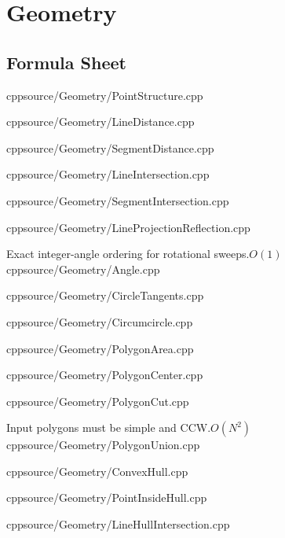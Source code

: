 \documentclass[portrait, 8pt, a4paper, oneside, twocolumn]{extarticle}
\begin{document}
\section {Geometry}

\subsection{Formula Sheet}


{}{}
{cpp}{source/Geometry/PointStructure.cpp}

{cpp}{source/Geometry/LineDistance.cpp}

{cpp}{source/Geometry/SegmentDistance.cpp}

{cpp}{source/Geometry/LineIntersection.cpp}

{cpp}{source/Geometry/SegmentIntersection.cpp}

{cpp}{source/Geometry/LineProjectionReflection.cpp}


{Exact integer-angle ordering for rotational sweeps.}{$O(1)$}
{cpp}{source/Geometry/Angle.cpp}

{cpp}{source/Geometry/CircleTangents.cpp}

{cpp}{source/Geometry/Circumcircle.cpp}

{cpp}{source/Geometry/PolygonArea.cpp}

{cpp}{source/Geometry/PolygonCenter.cpp}

{cpp}{source/Geometry/PolygonCut.cpp}

{Input polygons must be simple and CCW.}{$O(N^2)$}
{cpp}{source/Geometry/PolygonUnion.cpp}

{cpp}{source/Geometry/ConvexHull.cpp}

{cpp}{source/Geometry/PointInsideHull.cpp}

{cpp}{source/Geometry/LineHullIntersection.cpp}
\end{document}
